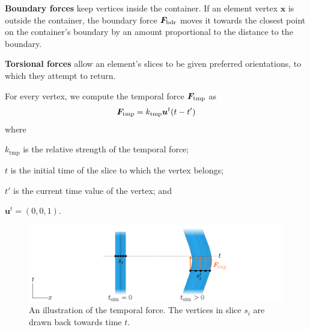 \newtext
{
\textbf{Boundary forces} keep vertices inside the container.
If an element vertex $\bm{x}$
is outside the container, the boundary force $\bm{F}_\mathrm{bdr}$ moves
it towards the closest point
on the container's boundary by an amount proportional to the distance to
the boundary.
}

\newtext
{
\textbf{Torsional forces} allow an element's slices to be given
preferred orientations, to which they attempt to return.
}


For every vertex, we compute the temporal force $\bm{F}_\mathrm{tmp}$ as
\begin{equation}
\bm{F}_\mathrm{tmp} = k_\mathrm{tmp} \bm{u}^t(t - t')
\end{equation}
where
\begin{packeddescriptions}
  \item[$k_\mathrm{tmp}$] is the relative strength of the temporal force;
  \item[$t$] is the initial time of the slice to which the vertex belongs;
  \item[$t'$] is the current time value of the vertex; and
  \item[$\bm{u}^t = (0,0,1)$.]
\end{packeddescriptions}

\begin{figure}
\centering
\includegraphics[width=1.0\textwidth]{figures/animationpak/t_force.pdf} 
\caption[An illustration of the temporal forces]
{\label{fig_animationpak_t_force} 
An illustration of the temporal force.  The vertices in slice
$s_i$ are drawn back towards time $t$.
}
\end{figure}

